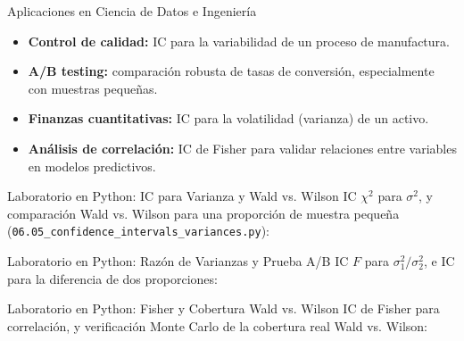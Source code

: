 \documentclass[10pt, aspectratio=169]{beamer}
\begin{document}
\begin{frame}{Aplicaciones en Ciencia de Datos e Ingeniería}
  \footnotesize
  \begin{itemize}\itemsep=0.1cm
    \item \textbf{Control de calidad:} IC para la variabilidad de un proceso de manufactura. \pause
    \item \textbf{A/B testing:} comparación robusta de tasas de conversión, especialmente con muestras pequeñas. \pause
    \item \textbf{Finanzas cuantitativas:} IC para la volatilidad (varianza) de un activo. \pause
    \item \textbf{Análisis de correlación:} IC de Fisher para validar relaciones entre variables en modelos predictivos.
  \end{itemize}
\end{frame}

\begin{frame}[fragile]{Laboratorio en Python: IC para Varianza y Wald vs. Wilson}
  \scriptsize
  IC $\chi^2$ para $\sigma^2$, y comparación Wald vs. Wilson para una proporción de muestra pequeña (\texttt{06.05\_confidence\_intervals\_variances.py}):
  {
  }
\end{frame}

\begin{frame}[fragile]{Laboratorio en Python: Razón de Varianzas y Prueba A/B}
  \scriptsize
  IC $F$ para $\sigma_1^2/\sigma_2^2$, e IC para la diferencia de dos proporciones:
  {
  }
\end{frame}

\begin{frame}[fragile]{Laboratorio en Python: Fisher y Cobertura Wald vs. Wilson}
  \scriptsize
  IC de Fisher para correlación, y verificación Monte Carlo de la cobertura real Wald vs. Wilson:
  {
  }
\end{frame}
\end{document}
